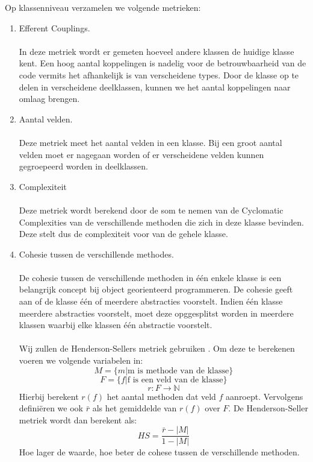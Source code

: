 Op klassenniveau verzamelen we volgende metrieken:
\begin{enumerate}
	\item 
		Efferent Couplings.
		\\
		\\
		In deze metriek wordt er gemeten hoeveel andere klassen de huidige klasse kent. Een hoog aantal koppelingen is nadelig voor de betrouwbaarheid van de code vermits het afhankelijk is van verscheidene types. Door de klasse op te delen in verscheidene deelklassen, kunnen we het aantal koppelingen naar omlaag brengen.
	\item
		Aantal velden.
		\\
		\\ %
		Deze metriek meet het aantal velden in een klasse. Bij een groot aantal velden moet er nagegaan worden of er verscheidene velden kunnen gegroepeerd worden in deelklassen.
	
	\item
		Complexiteit
		\\
		\\
		Deze metriek wordt berekend door de som te nemen van de Cyclomatic Complexities van de verschillende methoden die zich in deze klasse bevinden. Deze stelt dus de complexiteit voor van de gehele klasse.
		
	\item 
	{
		Cohesie tussen de verschillende methodes.
		\\
		\\
		De cohesie tussen de verschillende methoden in \'{e}\'{e}n enkele klasse is een belangrijk concept bij object georienteerd programmeren. De cohesie geeft aan of de klasse \'{e}\'{e}n of meerdere abstracties voorstelt. Indien \'{e}\'{e}n klasse meerdere abstracties voorstelt, moet deze opggesplitst worden in meerdere klassen waarbij elke klassen \'{e}\'{e}n abstractie voorstelt.
		\\
		\\
		Wij zullen de Henderson-Sellers metriek gebruiken \cite{HendersonSellers}. Om deze te berekenen voeren we volgende variabelen in: 
		$$ M = \{ m | \text{m is methode van de klasse} \} $$
		$$ F = \{ f | \text{f is een veld van de klasse} \} $$
		$$ r : F \rightarrow \mathbb{N} $$
Hierbij berekent $r(f)$ het aantal methoden dat veld $f$ aanroept. Vervolgens defini\"{e}ren we ook $\bar{r}$ als het gemiddelde van $r(f)$ over $F$. De Henderson-Seller metriek wordt dan berekent als:
		$$ HS = \frac{\bar{r} - |M|}{1 - |M|} $$
		Hoe lager de waarde, hoe beter de cohese tussen de verschillende methoden.
	} %
\end{enumerate}

